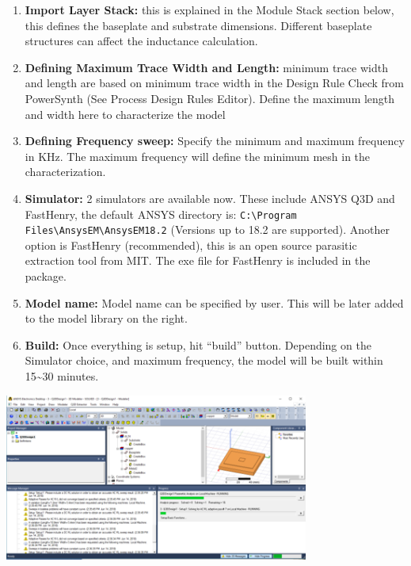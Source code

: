 \documentclass[11pt]{article}
\begin{document}
\begin{enumerate}
\item \textbf{Import Layer Stack:} this is explained in the Module Stack section below, this defines the baseplate and substrate dimensions. Different baseplate structures can affect the inductance calculation.

\item \textbf{Defining Maximum Trace Width and Length:} minimum trace width and length are based on minimum trace width in the Design Rule Check from PowerSynth (See Process Design Rules Editor). Define the maximum length and width here to characterize the model

\item \textbf{Defining Frequency sweep:} Specify the minimum and maximum frequency in KHz. The maximum frequency will define the minimum mesh in the characterization.

\item \textbf{Simulator:} 2 simulators are available now. These include ANSYS Q3D and FastHenry, the default ANSYS directory is: \texttt{C:\textbackslash{}Program Files\textbackslash{}AnsysEM\textbackslash{}AnsysEM18.2} (Versions up to 18.2 are supported). Another option is FastHenry (recommended), this is an open source parasitic extraction tool from MIT. The exe file for FastHenry is included in the package.

\item \textbf{Model name:}  Model name can be specified by user. This will be later added to the model library on the right.

\item \textbf{Build:} Once everything is setup, hit “build” button. Depending on the Simulator choice, and maximum frequency, the model will be built within 15\textasciitilde{}30 minutes.
\end{enumerate}

\begin{center}
\includegraphics[width=10cm]{./figs/22_RS1.png}
\end{center}
\end{document}
